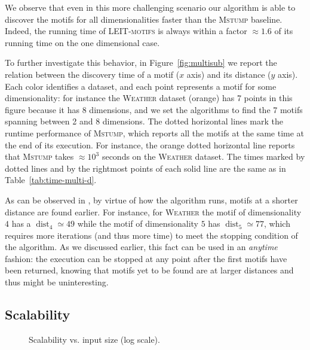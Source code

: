 We observe that even in this more challenging scenario our algorithm is able to discover the motifs for all dimensionalities faster than the \textsc{Mstump} baseline.
Indeed, the running time of \textsc{LEIT-motifs} is always within a factor $\approx 1.6$ of its running time on the one dimensional case.

To further investigate this behavior, in Figure~\ref{fig:multisub} we report the relation between the discovery time of a motif ($x$ axis) and its distance ($y$ axis). Each color identifies a dataset, and each point represents a motif for some dimensionality: for instance the \textsc{Weather} dataset (orange) has 7 points in this figure because it has 8 dimensions, and we set the algorithms to find the 7 motifs spanning between 2 and 8 dimensions.
The dotted horizontal lines mark the runtime performance of \textsc{Mstump}, which reports all the motifs at the same time at the end of its execution.
For instance, the orange dotted horizontal line reports that \textsc{Mstump} takes $\approx 10^3$ seconds on the \textsc{Weather} dataset.
The times marked by dotted lines and by the rightmost points of each solid line are the same as in Table~\ref{tab:time-multi-d}.

As can be observed in , by virtue of how the algorithm runs, motifs at a shorter distance are found earlier.
For instance, for \textsc{Weather} the motif of dimensionality $4$ has a $\operatorname{dist}_4\simeq49$ while the motif of dimensionality $5$ has $\operatorname{dist}_5\simeq 77$, which requires more iterations (and thus more time) to meet the stopping condition of the algorithm.
As we discussed earlier, this fact can be used in an \emph{anytime} fashion:
the execution can be stopped at any point after the first motifs have been returned, knowing that motifs yet to be found are at larger distances and thus might be uninteresting.

\subsection{Scalability}
\begin{figure}
    \centering
    \caption{Scalability vs. input size (log scale).}
    \label{fig:scalability}
\end{figure}

